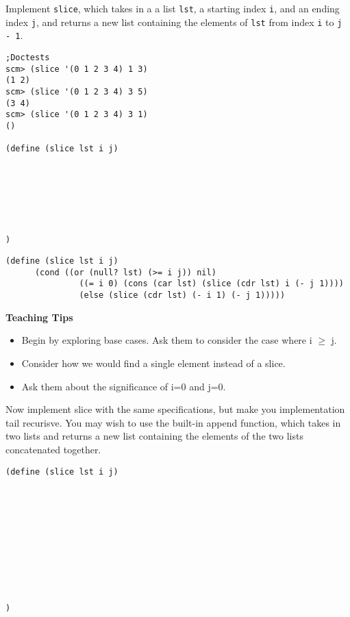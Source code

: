 \begin{blocksection}

\question Implement \texttt{slice}, which takes in a a list \texttt{lst}, a starting index \texttt{i}, and an ending index \texttt{j},
and returns a new list containing the elements of \texttt{lst} from index \texttt{i} to \texttt{j - 1}.

\begin{lstlisting}
;Doctests
scm> (slice '(0 1 2 3 4) 1 3)
(1 2)
scm> (slice '(0 1 2 3 4) 3 5)
(3 4)
scm> (slice '(0 1 2 3 4) 3 1)
()

(define (slice lst i j)
    






)
\end{lstlisting}

\end{blocksection}
\begin{blocksection}

\begin{solution}
\begin{lstlisting}
(define (slice lst i j)
      (cond ((or (null? lst) (>= i j)) nil)
               ((= i 0) (cons (car lst) (slice (cdr lst) i (- j 1))))
               (else (slice (cdr lst) (- i 1) (- j 1)))))
\end{lstlisting}
\end{solution}

\end{blocksection}

\begin{blocksection}
\begin{guide}
\textbf{Teaching Tips}
\begin{itemize}
	\item Begin by exploring base cases. Ask them to consider the case where i $\geq$ j.
	\item Consider how we would find a single element instead of a slice.
	\item Ask them about the significance of i=0 and j=0.
\end{itemize}
\end{guide}
\end{blocksection}


\begin{blocksection}

\question Now implement slice with the same specifications, but make you implementation tail recurisve.
\newline
You may wish to use the built-in append function, which takes in two lists and returns a 
new list containing the elements of the two lists concatenated together.

\begin{lstlisting}
(define (slice lst i j)
    










)
\end{lstlisting}
\end{blocksection}

